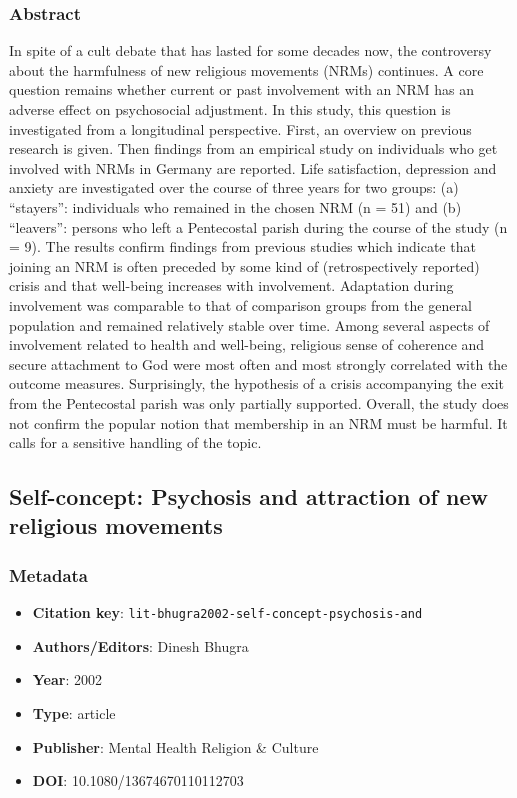 \subsubsection*{Abstract}
In spite of a cult debate that has lasted for some decades now, the controversy about the harmfulness of new religious movements (NRMs) continues. A core question remains whether current or past involvement with an NRM has an adverse effect on psychosocial adjustment. In this study, this question is investigated from a longitudinal perspective. First, an overview on previous research is given. Then findings from an empirical study on individuals who get involved with NRMs in Germany are reported. Life satisfaction, depression and anxiety are investigated over the course of three years for two groups: (a) “stayers”: individuals who remained in the chosen NRM (n = 51) and (b) “leavers”: persons who left a Pentecostal parish during the course of the study (n = 9). The results confirm findings from previous studies which indicate that joining an NRM is often preceded by some kind of (retrospectively reported) crisis and that well-being increases with involvement. Adaptation during involvement was comparable to that of comparison groups from the general population and remained relatively stable over time. Among several aspects of involvement related to health and well-being, religious sense of coherence and secure attachment to God were most often and most strongly correlated with the outcome measures. Surprisingly, the hypothesis of a crisis accompanying the exit from the Pentecostal parish was only partially supported. Overall, the study does not confirm the popular notion that membership in an NRM must be harmful. It calls for a sensitive handling of the topic.

\subsection{Self-concept: Psychosis and attraction of new religious movements}\label{lit:lit-bhugra2002-self-concept-psychosis-and}
\subsubsection*{Metadata}
\begin{itemize}
  \item \textbf{Citation key}: \texttt{lit-bhugra2002-self-concept-psychosis-and}
  \item \textbf{Authors/Editors}: Dinesh Bhugra
  \item \textbf{Year}: 2002
  \item \textbf{Type}: article
  \item \textbf{Publisher}: Mental Health Religion \& Culture
  \item \textbf{DOI}: 10.1080/13674670110112703
\end{itemize}
